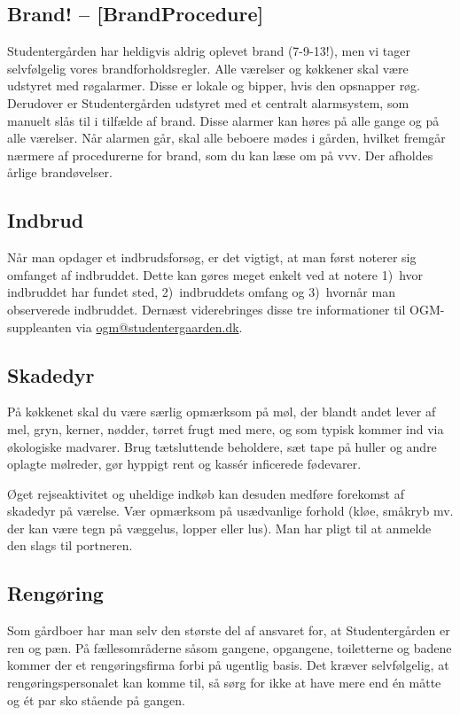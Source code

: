 \documentclass[11pt,article,twoside,openany,danish,extrafontsizes]{memoir} %
\begin{document}
\subsection{Brand! -- [BrandProcedure]}
Studentergården har heldigvis aldrig oplevet brand (7-9-13!), men vi tager selvfølgelig vores brandforholdsregler. Alle værelser og køkkener skal være udstyret med røgalarmer. Disse er lokale og bipper, hvis den opsnapper røg. Derudover er Studentergården udstyret med et centralt alarmsystem, som manuelt slås til i tilfælde af brand. Disse alarmer kan høres på alle gange og på alle værelser. Når alarmen går, skal alle beboere mødes i gården, hvilket fremgår nærmere af procedurerne for brand, som du kan læse om på vvv. Der afholdes årlige brandøvelser.

\subsection{Indbrud}
Når man opdager et indbrudsforsøg, er det vigtigt, at man først noterer sig omfanget af indbruddet. Dette kan gøres meget enkelt ved at notere
	1)~hvor indbruddet har fundet sted,
	2)~indbruddets omfang og
	3)~hvornår man observerede indbruddet.
Dernæst viderebringes disse tre informationer til OGM-suppleanten via \url{ogm@studentergaarden.dk}.

\subsection{Skadedyr}
På køkkenet skal du være særlig opmærksom på møl, der blandt andet lever af mel, gryn, kerner, nødder, tørret frugt med mere, og som typisk kommer ind via økologiske madvarer. Brug tætsluttende beholdere, sæt tape på huller og andre oplagte mølreder, gør hyppigt rent og kassér inficerede fødevarer.

Øget rejseaktivitet og uheldige indkøb kan desuden medføre forekomst af skadedyr på værelse. Vær opmærksom på usædvanlige forhold (kløe, småkryb mv. der kan være tegn på væggelus, lopper eller lus). Man har pligt til at anmelde den slags til portneren.

\subsection{Rengøring}
Som gårdboer har man selv den største del af ansvaret for, at Studentergården er ren og pæn. På fællesområderne såsom gangene, opgangene, toiletterne og badene kommer der et rengøringsfirma forbi på ugentlig basis. Det kræver selvfølgelig, at rengøringspersonalet kan komme til, så sørg for ikke at have mere end én måtte og ét par sko stående på gangen.
\end{document}
